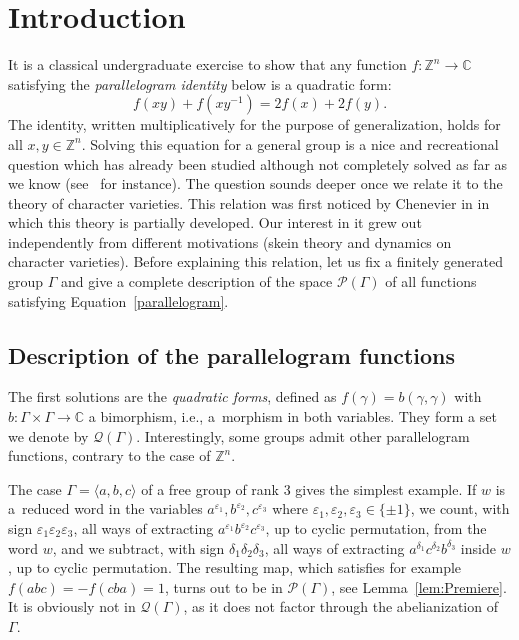 \documentclass[11pt]{article}
\newcommand{\ie}{i.e.,\xspace}
\let\mathcal\mathscr
\let\epsilon\varepsilon
\theoremstyle{definition}
\newcommand{\ZZ}{\mathbb{Z}}
\newcommand{\CC}{\mathbb{C}}
\begin{document}
\section{Introduction}

It is a classical undergraduate
exercise to show that any function
$f:\ZZ^n\to \CC$ satisfying the {\em parallelogram identity} below is a quadratic form:
\begin{equation}\label{parallelogram}
f(xy)+f(xy^{-1})=2f(x)+2f(y).
\end{equation}
The identity, written multiplicatively for the purpose of generalization,
holds for all $x,y\in \ZZ^n$.
Solving this equation for a general group is a nice and recreational question
which has already been studied although not completely solved as far as
we know (see~\cite{FriisStetkaer} for instance).
The question sounds deeper once we relate it to the theory of character
varieties. This relation was first noticed by Chenevier in \cite{Chenevier}
in which this theory is partially developed.
Our interest in it grew out independently from
different motivations (skein theory and dynamics on character varieties).
Before explaining this relation, let us fix a finitely generated
group $\Gamma$ and give a complete description of the space
$\mathcal{P}(\Gamma)$ of all functions satisfying
Equation~\eqref{parallelogram}.

\subsection{Description of the parallelogram functions}\label{ssec:IntroDesc}

The first solutions are the {\em quadratic forms}, defined as
$f(\gamma)=b(\gamma,\gamma)$ with $b\colon\Gamma\times\Gamma\to\CC$
a bimorphism, \ie a~morphism in both variables.
They form a set we denote by
$\mathcal{Q}(\Gamma)$.
Interestingly, some groups admit other parallelogram functions,
contrary to the case of $\ZZ^n$.

The case $\Gamma=\langle a,b,c\rangle$ of a free group of rank $3$ gives the
simplest example. If $w$ is a~reduced word in the variables
$a^{\epsilon_1},b^{\epsilon_2},c^{\epsilon_3}$
where $\epsilon_1,\epsilon_2,\epsilon_3\in\{\pm 1\}$,
we count, with sign
$\epsilon_1\epsilon_2\epsilon_3$, all ways of extracting
$a^{\epsilon_1} b^{\epsilon_2} c^{\epsilon_3}$, up to cyclic permutation,
from the word $w$, and we subtract, with sign $\delta_1\delta_2\delta_3$,
all ways of extracting $a^{\delta_1}c^{\delta_2}b^{\delta_3}$
inside $w$, up to cyclic permutation.
The resulting map, which satisfies for example $f(abc)=-f(cba)=1$, turns out
to be in $\mathcal{P}(\Gamma)$,
see Lemma~\ref{lem:Premiere}.
It is obviously not in $\mathcal{Q}(\Gamma)$,
as it does not factor through the abelianization of~$\Gamma$.
\end{document}
